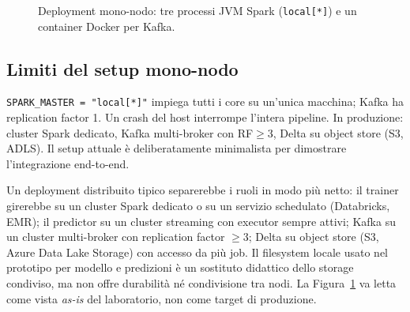 \begin{figure}[H]
  \centering
  \caption{Deployment mono-nodo: tre processi JVM Spark (\texttt{local[*]}) e un container Docker per Kafka.}
  \label{fig:deployment}
\end{figure}

\subsection{Limiti del setup mono-nodo}

\texttt{SPARK\_MASTER = "local[*]"} impiega tutti i core su un'unica macchina; Kafka ha replication factor 1.
Un crash del host interrompe l'intera pipeline.
In produzione: cluster Spark dedicato, Kafka multi-broker con RF$\geq$3, Delta su object store (S3, ADLS).
Il setup attuale è deliberatamente minimalista per dimostrare l'integrazione end-to-end.

Un deployment distribuito tipico separerebbe i ruoli in modo più netto: il trainer girerebbe su un cluster Spark dedicato o su un servizio schedulato (Databricks, EMR); il predictor su un cluster streaming con executor sempre attivi; Kafka su un cluster multi-broker con replication factor $\geq 3$; Delta su object store (S3, Azure Data Lake Storage) con accesso da più job.
Il filesystem locale usato nel prototipo per modello e predizioni è un sostituto didattico dello storage condiviso, ma non offre durabilità né condivisione tra nodi.
La Figura~\ref{fig:deployment} va letta come vista \emph{as-is} del laboratorio, non come target di produzione.

